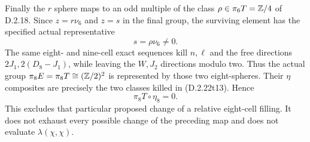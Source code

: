 Finally the $r$ sphere maps to an odd multiple of the
class $\rho\in\pi_6T=\mathbb Z/4$ of D.2.18.
Since $z=r\nu_6$ and $z=s$ in the final group, the
surviving element has the specified actual representative
\[
 s=\rho\nu_6\ne0.
 \tag{D.2.22t18}
\]
The same eight- and nine-cell exact sequences kill $n,\ell$
and the free directions $2J_1,2(D_8-J_1)$, while leaving
the $W,J_2$ directions modulo two.
Thus the actual group $\pi_8E=\pi_8T\cong(\mathbb Z/2)^2$ is
represented by those two eight-spheres.  Their $\eta$
composites are precisely the two classes killed in
\textup{(D.2.22t13)}.  Hence
\[
 \pi_8T\circ\eta_8=0.
 \tag{D.2.22t19}
\]
This excludes that particular proposed change of a relative
eight-cell filling.  It does not exhaust every possible change
of the preceding map and does not evaluate
$\lambda(\chi,\chi)$.
